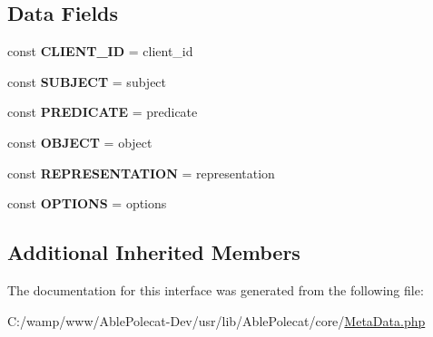 \subsection*{Data Fields}
\begin{DoxyCompactItemize}
\item 
\hypertarget{interface_able_polecat___meta_data_interface_a0e851703423f0e426a72843a724fe215}{}const {\bfseries C\+L\+I\+E\+N\+T\+\_\+\+I\+D} = \textquotesingle{}client\+\_\+id\textquotesingle{}\label{interface_able_polecat___meta_data_interface_a0e851703423f0e426a72843a724fe215}

\item 
\hypertarget{interface_able_polecat___meta_data_interface_ab63ae970cd2a8405dcafc310dc3102e1}{}const {\bfseries S\+U\+B\+J\+E\+C\+T} = \textquotesingle{}subject\textquotesingle{}\label{interface_able_polecat___meta_data_interface_ab63ae970cd2a8405dcafc310dc3102e1}

\item 
\hypertarget{interface_able_polecat___meta_data_interface_a5ae84ee64ebc1100f9037309d6723a8f}{}const {\bfseries P\+R\+E\+D\+I\+C\+A\+T\+E} = \textquotesingle{}predicate\textquotesingle{}\label{interface_able_polecat___meta_data_interface_a5ae84ee64ebc1100f9037309d6723a8f}

\item 
\hypertarget{interface_able_polecat___meta_data_interface_aa2f1769baa345f301668853c444000e1}{}const {\bfseries O\+B\+J\+E\+C\+T} = \textquotesingle{}object\textquotesingle{}\label{interface_able_polecat___meta_data_interface_aa2f1769baa345f301668853c444000e1}

\item 
\hypertarget{interface_able_polecat___meta_data_interface_aa8f5c4281b26694a81509ab77da8d86c}{}const {\bfseries R\+E\+P\+R\+E\+S\+E\+N\+T\+A\+T\+I\+O\+N} = \textquotesingle{}representation\textquotesingle{}\label{interface_able_polecat___meta_data_interface_aa8f5c4281b26694a81509ab77da8d86c}

\item 
\hypertarget{interface_able_polecat___meta_data_interface_ad7a0cb2592aa45dd08251b948d43f1d6}{}const {\bfseries O\+P\+T\+I\+O\+N\+S} = \textquotesingle{}options\textquotesingle{}\label{interface_able_polecat___meta_data_interface_ad7a0cb2592aa45dd08251b948d43f1d6}

\end{DoxyCompactItemize}
\subsection*{Additional Inherited Members}


The documentation for this interface was generated from the following file\+:\begin{DoxyCompactItemize}
\item 
C\+:/wamp/www/\+Able\+Polecat-\/\+Dev/usr/lib/\+Able\+Polecat/core/\hyperlink{_meta_data_8php}{Meta\+Data.\+php}\end{DoxyCompactItemize}
